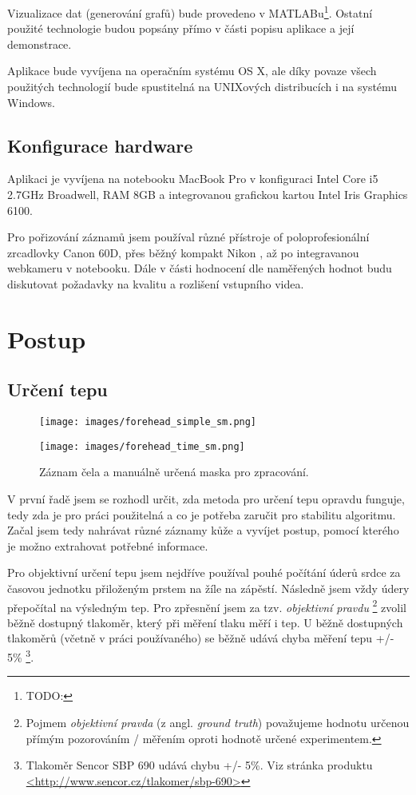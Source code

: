 \documentclass[
  digital, %
  table,   %
%
  lof,     %
  lot,     %
]{fithesis3}
\begin{document}
Vizualizace dat (generování grafů) bude provedeno v MATLABu\footnote{TODO:}. Ostatní použité technologie budou popsány přímo v části popisu aplikace a její demonstrace.

Aplikace bude vyvíjena na operačním systému OS X, ale díky povaze všech použitých technologií bude spustitelná na UNIXových distribucích i na systému Windows.

\section{Konfigurace hardware}
Aplikaci je vyvíjena na notebooku MacBook Pro v konfiguraci Intel Core i5 2.7GHz Broadwell, RAM 8GB a integrovanou grafickou kartou Intel Iris Graphics 6100.

Pro pořizování záznamů jsem používal různé přístroje of poloprofesionální zrcadlovky Canon 60D, přes běžný kompakt Nikon
, až po integravanou webkameru v notebooku. Dále v části hodnocení dle naměřených hodnot budu diskutovat požadavky na kvalitu a rozlišení vstupního videa.

\chapter{Postup}
\section{Určení tepu}
\begin{figure}
  \begin{minipage}{.5\textwidth}
    \texttt{[image: images/forehead\_simple\_sm.png]}
  \end{minipage}
  \begin{minipage}{.5\textwidth}
    \texttt{[image: images/forehead\_time\_sm.png]}
  \end{minipage}
  \caption{Záznam čela a manuálně určená maska pro zpracování.}
  \label{fig:initial-proof-forehead}
\end{figure}
V první řadě jsem se rozhodl určit, zda metoda pro určení tepu opravdu funguje, tedy zda je pro práci použitelná a co je potřeba zaručit pro stabilitu algoritmu. Začal jsem tedy nahrávat různé záznamy kůže a vyvíjet postup, pomocí kterého je možno extrahovat potřebné informace.

Pro objektivní určení tepu jsem nejdříve používal pouhé počítání úderů srdce za časovou jednotku přiloženým prstem na žíle na zápěstí. Následně jsem vždy údery přepočítal na výsledným tep. Pro zpřesnění jsem za tzv. \emph{objektivní pravdu}
\footnote{Pojmem \emph{objektivní pravda} (z angl. \emph{ground truth}) považujeme hodnotu určenou přímým pozorováním / měřením oproti hodnotě určené experimentem. }
zvolil běžně dostupný tlakoměr, který při měření tlaku měří i tep. U běžně dostupných tlakoměrů (včetně v práci používaného) se běžně udává chyba měření tepu +/- 5\% \footnote{Tlakoměr Sencor SBP 690 udává chybu +/- 5\%. Viz stránka produktu \url{<http://www.sencor.cz/tlakomer/sbp-690>}}.
\end{document}
